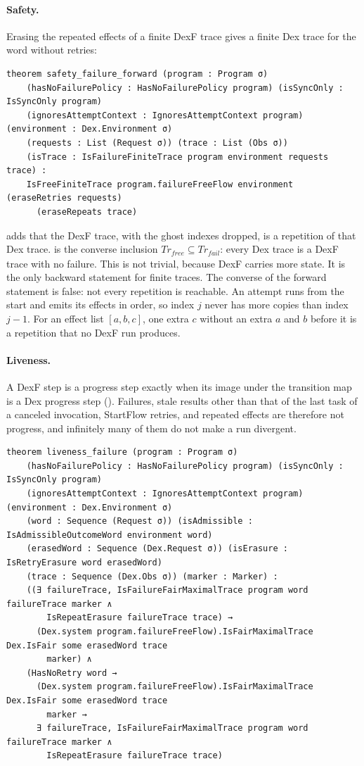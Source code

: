 \paragraph{Safety.}
Erasing the repeated effects of a finite DexF trace gives a finite Dex
trace for the word without retries:
\begin{Verbatim}[fontsize=\scriptsize]
theorem safety_failure_forward (program : Program σ)
    (hasNoFailurePolicy : HasNoFailurePolicy program) (isSyncOnly : IsSyncOnly program)
    (ignoresAttemptContext : IgnoresAttemptContext program) (environment : Dex.Environment σ)
    (requests : List (Request σ)) (trace : List (Obs σ))
    (isTrace : IsFailureFiniteTrace program environment requests trace) :
    IsFreeFiniteTrace program.failureFreeFlow environment (eraseRetries requests)
      (eraseRepeats trace)
\end{Verbatim}
 adds that the DexF trace, with the ghost
indexes dropped, is a repetition of that Dex trace.
 is the converse inclusion
$\mathit{Tr}_\mathit{free} \subseteq \mathit{Tr}_\mathit{fail}$: every Dex
trace is a DexF trace with no failure. This is not trivial, because DexF
carries more state. It is the only backward statement for finite traces.
The converse of the forward statement is false: not every repetition is
reachable. An attempt runs from the start and emits its effects in order,
so index $j$ never has more copies than index $j-1$. For an effect list
$[a, b, c]$, one extra $c$ without an extra $a$ and $b$ before it is a
repetition that no DexF run produces.

\paragraph{Liveness.}
A DexF step is a progress step exactly when its image under the transition
map is a Dex progress step (). Failures,
stale results other than that of the last task of a canceled invocation,
StartFlow retries, and repeated effects are therefore not progress, and
infinitely many of them do not make a run divergent.

\begin{Verbatim}[fontsize=\scriptsize]
theorem liveness_failure (program : Program σ)
    (hasNoFailurePolicy : HasNoFailurePolicy program) (isSyncOnly : IsSyncOnly program)
    (ignoresAttemptContext : IgnoresAttemptContext program) (environment : Dex.Environment σ)
    (word : Sequence (Request σ)) (isAdmissible : IsAdmissibleOutcomeWord environment word)
    (erasedWord : Sequence (Dex.Request σ)) (isErasure : IsRetryErasure word erasedWord)
    (trace : Sequence (Dex.Obs σ)) (marker : Marker) :
    ((∃ failureTrace, IsFailureFairMaximalTrace program word failureTrace marker ∧
        IsRepeatErasure failureTrace trace) →
      (Dex.system program.failureFreeFlow).IsFairMaximalTrace Dex.IsFair some erasedWord trace
        marker) ∧
    (HasNoRetry word →
      (Dex.system program.failureFreeFlow).IsFairMaximalTrace Dex.IsFair some erasedWord trace
        marker →
      ∃ failureTrace, IsFailureFairMaximalTrace program word failureTrace marker ∧
        IsRepeatErasure failureTrace trace)
\end{Verbatim}

